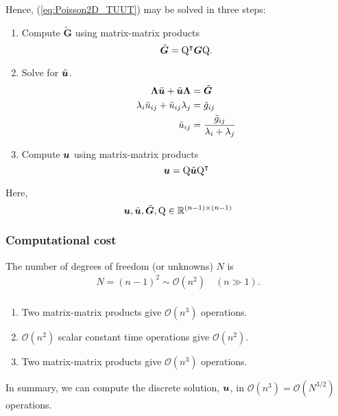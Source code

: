 Hence, (\ref{eq:Poisson2D_TUUT}) may be solved in three steps:

\begin{enumerate}
\item Compute $\tilde{\bm G}$ using matrix-matrix products
  \begin{equation*}
    \tilde{\boldsymbol G} = {\mathrm Q}^\intercal \boldsymbol G {\mathrm Q}.
  \end{equation*}
\item Solve for $\tilde{{{\boldsymbol u}}}$.
  \begin{align*}
    \boldsymbol \Lambda \tilde{{{\boldsymbol u}}} + \tilde{{{\boldsymbol u}}} \boldsymbol \Lambda &= \tilde{\boldsymbol G} \\
    \lambda_i \tilde{u}_{ij} + \tilde{u}_{ij} \lambda_j &= \tilde{g}_{ij} \\
    \tilde{u}_{ij} &= \frac{\tilde{g}_{ij}}{\lambda_i + \lambda_j}
  \end{align*}
\item Compute ${{\boldsymbol u}}$ using matrix-matrix products
  \begin{equation*}
    {{\boldsymbol u}} = {\mathrm Q} \tilde{{{\boldsymbol u}}} {\mathrm Q}^\intercal
  \end{equation*}
\end{enumerate}

Here,
\begin{equation*}
  {{\boldsymbol u}}, \tilde{{{\boldsymbol u}}}, \tilde{\boldsymbol G}, {\mathrm Q} \in \mathbb{R}^{(n-1) \times (n-1)}
\end{equation*}

\subsubsection{Computational cost}

The number of degrees of freedom (or unknowns) $N$ is
\begin{align*}
N = (n-1)^2 \sim \mathcal{O}(n^2) \quad (n \gg 1).\\
\end{align*}

\begin{enumerate}
\item Two matrix-matrix products give $\mathcal{O}(n^3)$ operations.
\item $\mathcal{O}(n^2)$ scalar constant time operations give $\mathcal{O}(n^2)$.
\item Two matrix-matrix products give $\mathcal{O}(n^3)$ operations.
\end{enumerate}
In summary, we can compute the discrete solution, ${{\boldsymbol u}}$, in
$\mathcal{O}(n^3)=\mathcal{O}(N^{3/2})$ operations.

